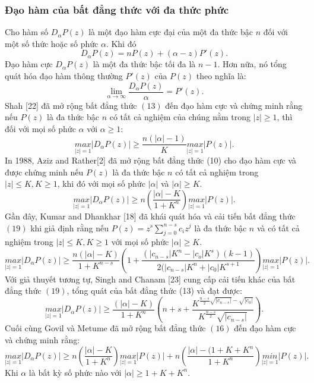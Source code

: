 \documentclass[a5paper,12pt]{report}%
\theoremstyle{definition}
\begin{document}
	\subsubsection{Đạo hàm của bất đẳng thức với đa thức phức}
	Cho hàm số $D_\alpha P(z)$ là một đạo hàm cực đại của một đa thức bậc $n$ đối với một số thức hoặc số phức $\alpha$. Khi đó
	\[D_\alpha P(z)= nP(z)+(\alpha -z)P'(z).\]
	Đạo hàm cực $D_\alpha P(z)$ là một đa thức bậc tối đa là $n-1$. Hơn nữa, nó tổng quát hóa đạo hàm thông thường $P'(z)$ của $P(z)$ theo nghĩa là:
	\[\lim_{\alpha\to\infty}\frac{D_\alpha P(z)}{\alpha }=P'(z).\]
	Shah [22] đã mở rộng bất đẳng thức $(13)$ đến đạo hàm cực và chứng minh rằng nếu $P(z)$ là đa thức bậc $n$ có tất cả nghiệm của chúng nằm trong $|z|\ge 1$, thì đối với mọi số phức $\alpha$ với $\alpha \ge 1$:
	\begin{equation}\label{(13)}
		\underset{|z|=1}{max}|D_\alpha P(z)| \ge \frac{n(|\alpha|-1)}{K}\underset{|z|=1}{max}|P(z)|.
	\end{equation}
	In 1988, Aziz and Rather[2] đã mở rộng bất đẳng thức (10) cho đạo hàm cực và được chứng minh nếu $P(z)$ là đa thức bậc $n$ có tất cả nghiệm trong $|z| \le K, K \ge 1$, khi đó với mọi số phức $|\alpha|$ và $|\alpha| \ge K.$
	\begin{equation}\label{(14)}
		\underset{|z|=1}{max}|D_\alpha P(z)| \ge n\left(\frac{|\alpha|-K}{1+K^n}\right)\underset{|z|=1}{max}|P(z)|.
	\end{equation}
	Gần đây, Kumar and Dhankhar [18] đã khái quát hóa và cải tiến bất đẳng thức $(19)$ khi giả định rằng nếu $P(z)=z^s\sum_{j=0}^{n-s}c_iz^j$ là đa thức bậc $n$ và có tất cả nghiệm trong $|z| \le K, K\ge 1$ với mọi số phức $|\alpha| \ge K$. 
	\begin{equation}\label{(15)}
		\underset{|z|=1}{max}|D_\alpha P(z)|\ge \frac{n(|\alpha|-K)}{1+K^{n-s}}\left(1+\frac{(|c_{n-s}|K^n-|c_o|K^s)(k-1)}{2(|c_{n-s}|K^n+|c_0|K^{s+1}}\right)\underset{|z|=1}{max}|P(z)|.
	\end{equation}
	Với giả thuyết tương tự, Singh and Chanam [23] cung cấp cải tiến khác của bất đẳng thức $(19)$, tổng quát của bất đẳng thức (13) và đạt được:
	\begin{equation}\label{(16)}
		\underset{|z|=1}{max}|D_\alpha P(z)| \ge \frac{(|\alpha|-K)}{1+K^n}\left(n+s+\frac{K^{\frac{n-s}{2}\sqrt{|c_{n-s}|}-\sqrt{|c_0|}}}{K^{\frac{n-s}{2}}\sqrt{|c_{n-s}|}}\right).
	\end{equation}
	Cuối cùng Govil và Metume \cite{govil2004some} đã mở rộng bất đẳng thức $(16)$ đến đạo hàm cực và chứng minh rằng:
	\begin{equation}\label{(17)}
		\underset{|z|=1}{max}|D_\alpha P(z)| \ge n\left(\frac{|\alpha|-K}{1+K^n}\right)\underset{|z|=1}{max}|P(z)|+n\left(\frac{|\alpha|-(1+K+K^n}{1+K^n}\right)\underset{|z|=1}{min}|P(z)|.
	\end{equation}
	Khi $\alpha$ là bất kỳ số phức nào với $|\alpha|\ge 1+K+K^n$.
\end{document}
